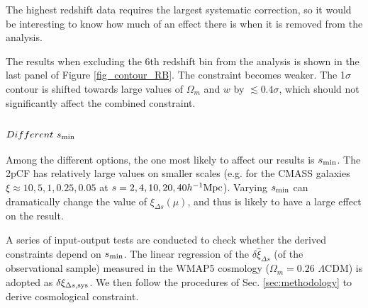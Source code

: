 \documentclass[iop]{emulateapj}
\begin{document}
The highest redshift data requires the largest systematic correction, 
so it would be interesting to know how much of an effect there is when it is removed from the analysis.

The results when excluding the 6th redshift bin from the analysis is shown in the last panel of Figure \ref{fig_contour_RB}.
The constraint becomes weaker.
The 1$\sigma$ contour is shifted towards large values of $\Omega_m$ and $w$ by $\lesssim0.4\sigma$,
which should not significantly affect the combined constraint.




\subsection{$Different\ s_{\rm min}$}


Among the different options, %
the one most likely to affect our results is $s_{\rm min}$.
The 2pCF has relatively large values on smaller scales
(e.g. for the CMASS galaxies $\xi\approx10,5,1,0.25,0.05$ at $s=2,4,10,20,40 h^{-1}{\rm Mpc}$).
Varying $s_{\rm min}$ can dramatically change the value of $\xi_{\Delta s}(\mu)$,
and thus is likely to have a large effect on the result.

A series of input-output tests are conducted to check whether the derived constraints depend on $s_{\rm min}$.
The linear regression of the $\delta\hat\xi_{\Delta s}$ (of the observational sample) 
measured in the WMAP5 cosmology ($\Omega_m=0.26$ $\Lambda$CDM) 
is adopted as $\delta\xi_{\Delta s, \rm sys}$. 
We then follow the procedures of Sec. \ref{sec:methodology} to derive cosmological constraint.
\end{document}
